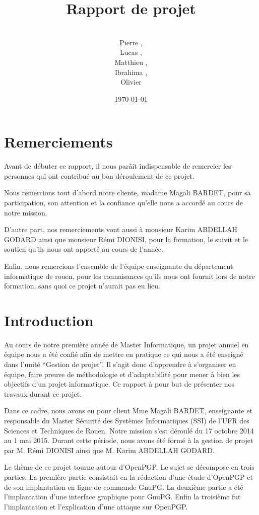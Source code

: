 \documentclass{../res/univ-projet}
\title{Rapport de projet}
\author{\\ Pierre \bsc{Balmelle},\\ Lucas \bsc{Barbay}, \\ Matthieu \bsc{Fin},
\\ Ibrahima \bsc{Sory Barry},\\ Olivier \bsc{Thibault}}
\date{\today}
\begin{document}
\maketitle
\newpage
\thispagestyle{empty}
\setcounter{page}{0}
\section*{Remerciements}
Avant de débuter ce rapport, il nous parâit indispensable de remercier les 
personnes qui ont contribué au bon déroulement de ce projet.

Nous remercions tout d'abord notre cliente, madame Magali BARDET, pour sa 
participation, son attention et la confiance qu'elle nous a accordé au 
cours de notre mission.

D'autre part, nos remerciements vont aussi à monsieur Karim ABDELLAH 
GODARD ainsi que monsieur Rémi DIONISI, pour la formation, le suivit 
et le soutien qu'ils nous ont apporté au cours de l'année.

Enfin, nous remercions l'ensemble de l'équipe enseignante du département 
informatique de rouen, pour les connaisances qu'ils nous ont fournit lors 
de notre formation, sans quoi ce projet n'aurait pas eu lieu.
\newpage
\setcounter{page}{0}
\tableofcontents

\newpage

\section{Introduction}

Au cours de notre première année de Master Informatique, un projet annuel 
en équipe nous a été confié afin de mettre en pratique ce qui nous a 
été enseigné dans l'unité ``Gestion de projet''. Il s'agit donc d'apprendre 
à s'organiser en équipe, faire preuve de méthodologie et d'adaptabilité 
pour mener à bien les objectifs d'un projet informatique. Ce rapport à pour 
but de présenter nos travaux durant ce projet.

Dans ce cadre, nous avons eu pour client Mme Magali BARDET, enseignante et 
responsable du Master Sécurité des Systèmes Informatiques (SSI) de l'UFR des 
Sciences et Techniques de Rouen. Notre mission s'est déroulé du 17 octobre 
2014 au 1 mai 2015. Durant cette période, nous avons été formé à la 
gestion de projet par M. Rémi DIONISI ainsi que M. Karim ABDELLAH GODARD.

Le thème de ce projet tourne autour d'OpenPGP. Le sujet se décompose en trois 
parties. La première partie consistait en la rédaction d'une étude d'OpenPGP 
et de son implantation en ligne de commande GnuPG. La deuxième partie a été 
l'implantation d'une interface graphique pour GnuPG. Enfin la troisième fut 
l'implantation et l'explication d'une attaque sur OpenPGP.
\end{document}

